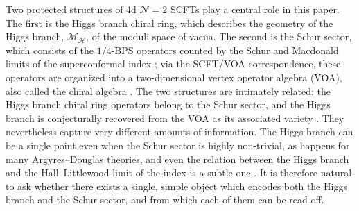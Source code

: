 \documentclass[12pt]{article}
\numberwithin{equation}{section}
\numberwithin{figure}{section}
\theoremstyle{plain}
\theoremstyle{definition}
\begin{document}
Two protected structures of 4d $\mathcal{N}=2$ SCFTs play a central role in this paper. The first is the Higgs branch chiral ring, which describes the geometry of the Higgs branch, $\mathcal{M}_\mathcal{H}$, of the moduli space of vacua. The second is the Schur sector, which consists of the $1/4$-BPS operators counted by the Schur and Macdonald limits of the superconformal index \cite{Gadde:2011uv}; via the SCFT/VOA correspondence, these operators are organized into a two-dimensional vertex operator algebra (VOA), also called the chiral algebra \cite{Beem:2013sza}. The two structures are intimately related: the Higgs branch chiral ring operators belong to the Schur sector, and the Higgs branch is conjecturally recovered from the VOA as its associated variety \cite{Beem:2017ooy,arakawa2015associated}. They nevertheless capture very different amounts of information. The Higgs branch can be a single point even when the Schur sector is highly non-trivial, as happens for many Argyres--Douglas theories, and even the relation between the Higgs branch and the Hall--Littlewood limit of the index is a subtle one \cite{Kang:2022zsl}. It is therefore natural to ask whether there exists a single, simple object which encodes both the Higgs branch and the Schur sector, and from which each of them can be read off.
\end{document}
